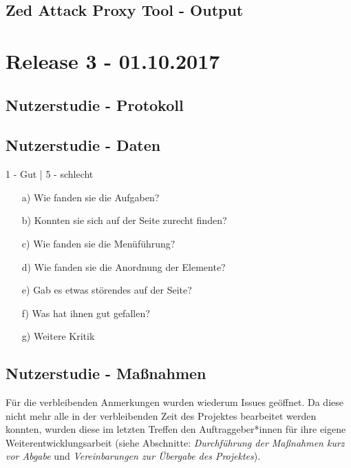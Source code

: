\documentclass[accentcolor=tud0b,12pt,paper=a4]{tudreport}
\begin{document}
	\subsection*{Zed Attack Proxy Tool - Output}
	


\section{Release 3 - 01.10.2017}

	\subsection*{Nutzerstudie - Protokoll}
	
	
	\subsection*{Nutzerstudie - Daten}
	\begin{adjustbox}{max width=\textwidth}
	\end{adjustbox}
	\newline
	\begin{footnotesize} 1 - Gut | 5 - schlecht \end{footnotesize}
	\begin{itemize}
		\item[a)] Wie fanden sie die Aufgaben?
		\item[b)] Konnten sie sich auf der Seite zurecht finden?
		\item[c)] Wie fanden sie die Menüführung?
		\item[d)] Wie fanden sie die Anordnung der Elemente?
		\item[e)] Gab es etwas störendes auf der Seite?
		\item[f)] Was hat ihnen gut gefallen?
		\item[g)] Weitere Kritik
	\end{itemize}

	\subsection*{Nutzerstudie - Maßnahmen}
	Für die verbleibenden Anmerkungen wurden wiederum Issues geöffnet. Da diese nicht mehr alle in der verbleibenden Zeit des Projektes bearbeitet werden konnten, wurden diese im letzten Treffen den Auftraggeber*innen für ihre eigene Weiterentwicklungsarbeit (siehe Abschnitte: \emph{Durchführung der Maßnahmen kurz vor Abgabe} und \emph{Vereinbarungen zur Übergabe des Projektes}).
\end{document}
